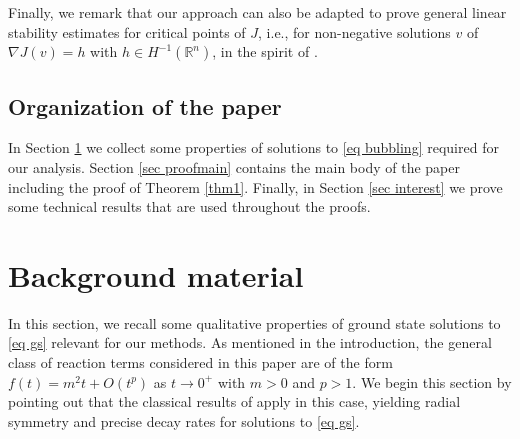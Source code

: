 \documentclass[11pt,letterpaper,reqno]{amsart}
\newcommand{\R}{\mathbb{R}}
\theoremstyle{plain}%
\theoremstyle{definition}
\numberwithin{equation}{section}
\numberwithin{figure}{section}
\begin{document}
Finally, we remark that our approach can also be adapted to prove general linear stability estimates for critical points of $J$, i.e., for non-negative solutions $v$ of $\nabla J(v) = h$ with $h \in H^{-1}(\R^n)$, in the spirit of \cite{figalli2020sharp, aryan2023stability, deng2025sharp}.

\subsection{Organization of the paper}

In Section \ref{sec background} we collect some properties of solutions to \eqref{eq bubbling} required for our analysis. Section \ref{sec proofmain} contains the main body of the paper including the proof of Theorem \ref{thm1}. Finally, in Section \ref{sec interest} we prove some technical results that are used throughout the proofs.

\section{Background material}\label{sec background}

In this section, we recall some qualitative properties of ground state solutions to \eqref{eq gs} relevant for our methods. As mentioned in the introduction, the general class of reaction terms considered in this paper are of the form $f(t) = m^2t+O(t^p)$ as $t\to 0^+$ with $m>0$ and $p>1$. We begin this section by pointing out that the classical results of \cite{gidas1981symmetry} apply in this case, yielding radial symmetry and precise decay rates for solutions to \eqref{eq gs}.
\end{document}
